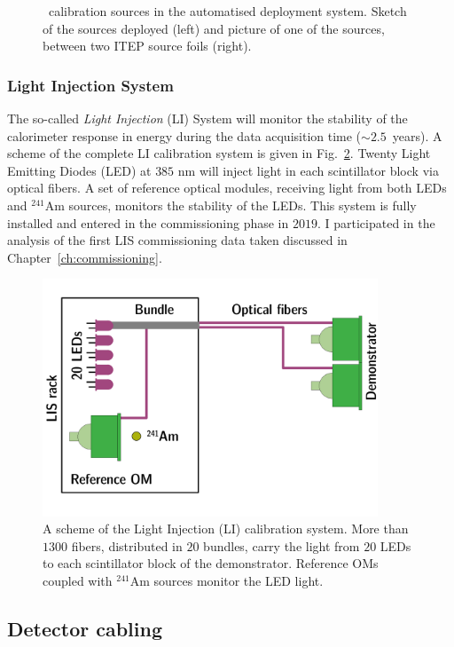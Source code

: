 \begin{figure}[!h]
\begin{subfigure}[t]{0.49\textwidth}
  \end{subfigure}
  \caption{\Bi\ calibration sources in the automatised deployment system.
    Sketch of the sources deployed (left) and picture of one of the sources, between two ITEP source foils (right).
    \label{fig:bi_sources}}
\end{figure}

\subsubsection*{Light Injection System}


The so-called \emph{Light Injection} (LI) System will monitor the stability of the calorimeter response in energy during the data acquisition time ($\sim2.5$~years).
A scheme of the complete LI calibration system is given in Fig.~\ref{fig:LIS_scheme}.
Twenty Light Emitting Diodes (LED) at $385$ nm will inject light in each scintillator block via optical fibers.
A set of reference optical modules, receiving light from both LEDs and $^{241}$Am sources, monitors the stability of the LEDs.
This system is fully installed and entered in the commissioning phase in $2019$.
I participated in the analysis of the first LIS commissioning data taken discussed in Chapter~\ref{ch:commissioning}.
\begin{figure}[h]
  \centering
  \includegraphics[width=10cm]{SNdemonstrator/fig_SNdemonstrator/LIS_scheme.pdf}
  \caption{A scheme of the Light Injection (LI) calibration system.
    More than $1300$ fibers, distributed in $20$ bundles, carry the light from $20$ LEDs to each scintillator block of the demonstrator.
    Reference OMs coupled with $^{241}$Am sources monitor the LED light.
    \label{fig:LIS_scheme}}
\end{figure}


\subsection{Detector cabling}

